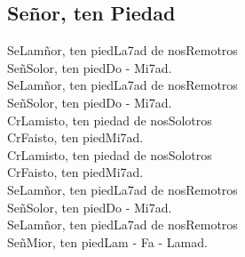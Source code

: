\subsection{Señor, ten Piedad}

\begin{center}

{\Large
Se\ac{Lam}ñor, ten pied\ac{La7}ad de nos\ac{Rem}otros\\
Señ\ac{Sol}or, ten pied\ac{Do - Mi7}ad.\\
\vspace{1em}
Se\ac{Lam}ñor, ten pied\ac{La7}ad de nos\ac{Rem}otros\\
Señ\ac{Sol}or, ten pied\ac{Do - Mi7}ad.\\
\vspace{1em}
Cr\ac{Lam}isto, ten piedad de nos\ac{Sol}otros\\
Cr\ac{Fa}isto, ten pied\ac{Mi7}ad.\\
\vspace{1em}
Cr\ac{Lam}isto, ten piedad de nos\ac{Sol}otros\\
Cr\ac{Fa}isto, ten pied\ac{Mi7}ad.\\
\vspace{1em}
Se\ac{Lam}ñor, ten pied\ac{La7}ad de nos\ac{Rem}otros\\
Señ\ac{Sol}or, ten pied\ac{Do - Mi7}ad.\\
\vspace{1em}
Se\ac{Lam}ñor, ten pied\ac{La7}ad de nos\ac{Rem}otros\\
Señ\ac{Mi}or, ten pied\ac{Lam - Fa - Lam}ad.\\
}
\end{center}

